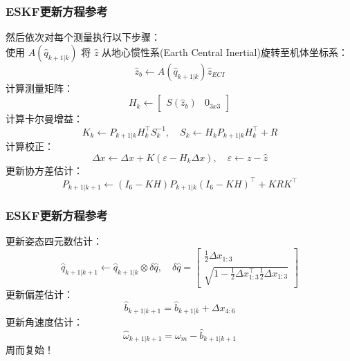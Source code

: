 \documentclass{beamer}
\begin{document}
\begin{frame}
    \frametitle{ESKF更新方程参考}
    然后依次对每个测量执行以下步骤： \\
    使用 $A(\hat{q}_{k+1|k})$ 将 $\hat{z}$ 从地心惯性系(Earth Central Inertial)旋转至机体坐标系：
    \begin{equation}
        \hat{z}_b \leftarrow A(\hat{q}_{k+1|k}) \hat{z}_{ECI}
    \end{equation}
    计算测量矩阵：
    \begin{equation}
        H_k \leftarrow \begin{bmatrix}
            S(\hat{z}_b) & 0_{3x3}
        \end{bmatrix}
    \end{equation}
    计算卡尔曼增益：
    \begin{equation}
        K_k \leftarrow P_{k+1|k} H_k^{\top} S_k^{-1}, \quad S_k \leftarrow H_k P_{k+1|k} H_k^{\top} + R
    \end{equation}
    计算校正：
    \begin{equation}
        \Delta x \leftarrow \Delta x + K (\varepsilon - H_k \Delta x), \quad \varepsilon \leftarrow z - \hat{z}
    \end{equation}
    更新协方差估计：
    \begin{equation}
        {P}_{k+1 | k+1} \leftarrow \left({I}_{6}-{K} {H}\right) {P}_{k+1 | k}\left({I}_{6}-{K} {H}\right)^{\top}+{K} {R} {K}^{\top}
    \end{equation}
\end{frame}


\begin{frame}
    \frametitle{ESKF更新方程参考}
    更新姿态四元数估计：
    \begin{equation}
        \hat{{q}}_{k+1 | k+1} \leftarrow \hat{{q}}_{k+1 | k} \otimes \delta \hat{{q}}, \quad 
    \delta \hat{{q}}=\left[\begin{array}{c}{\frac{1}{2}\Delta x_{1:3}} \\ {\sqrt{1-\frac{1}{2}\Delta x_{1:3}^{\top} \frac{1}{2}\Delta x_{1:3}}}\end{array}\right]
    \end{equation}
    更新偏差估计：
    \begin{equation}
        \hat{{b}}_{k+1 | k+1}=\hat{{b}}_{k+1 | k}+\Delta x_{4:6}
    \end{equation}
    更新角速度估计：
    \begin{equation}
        \hat{\omega}_{k+1 | k+1}=\omega_{m}-\hat{{b}}_{k+1 | k+1}
    \end{equation}
    周而复始！
\end{frame}
\end{document}

